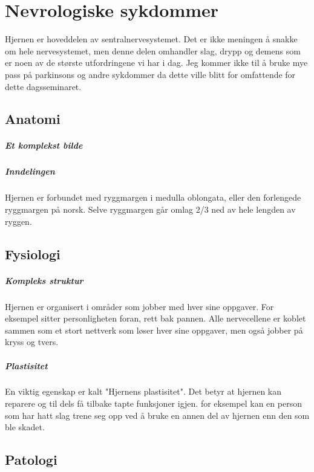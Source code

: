 \chapter{Nevrologiske sykdommer}
		Hjernen er hoveddelen av sentralnervesystemet. Det er ikke meningen å snakke om hele nervesystemet, men denne delen omhandler slag, drypp og demens som er noen av de største utfordringene vi har i dag. Jeg kommer ikke til å bruke mye pass på parkinsons og andre sykdommer da dette ville blitt for omfattende for dette dagsseminaret.
		\section{Anatomi}
			\paragraph{Et komplekst bilde}
			\paragraph{Inndelingen\\}
				Hjernen er forbundet med ryggmargen i medulla oblongata, eller den forlengede ryggmargen på norsk. Selve ryggmargen går omlag 2/3 ned av hele lengden av ryggen. 
		\section{Fysiologi}
			\paragraph{Kompleks struktur\\}
				Hjernen er organisert i områder som jobber med hver sine oppgaver. For eksempel sitter personligheten foran, rett bak pannen. Alle nervecellene er koblet sammen som et stort nettverk som løser hver sine oppgaver, men også jobber på kryss og tvers. 
			\paragraph{Plastisitet\\}
				En viktig egenskap er kalt "Hjernens plastisitet". Det betyr at hjernen kan reparere og til dels få tilbake tapte funksjoner igjen. for eksempel kan en person som har hatt slag trene seg opp ved å bruke en annen del av hjernen enn den som ble skadet. 	
		\section{Patologi}
